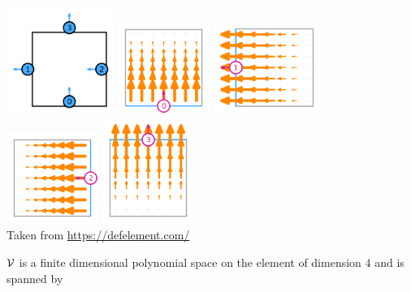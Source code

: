 \begin{center}
\includegraphics[width=3.5cm]{images/pair_raviart-thomas/element-NCF-variant-equispaced-quadrilateral-1-dofs}
\includegraphics[width=3cm]{images/pair_raviart-thomas/element-NCF-variant-equispaced-quadrilateral-1-0}
\includegraphics[width=3.5cm]{images/pair_raviart-thomas/element-NCF-variant-equispaced-quadrilateral-1-1}
\includegraphics[width=3cm]{images/pair_raviart-thomas/element-NCF-variant-equispaced-quadrilateral-1-2}
\includegraphics[width=3cm]{images/pair_raviart-thomas/element-NCF-variant-equispaced-quadrilateral-1-3}\\
{\captionfont Taken from \url{https://defelement.com/}}
\end{center}

${\cal V}$ is a finite dimensional polynomial space on the element of dimension $4$ and is spanned by 

